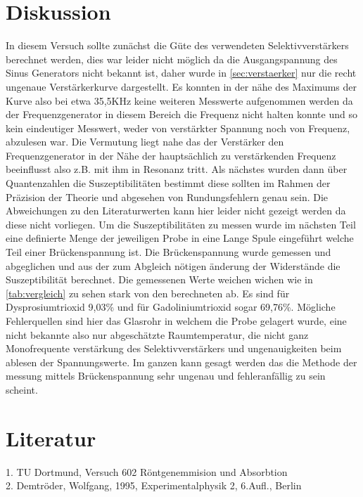 \section{Diskussion} %
\label{sec:Diskussion}
In diesem Versuch sollte zunächst die Güte des verwendeten Selektivverstärkers berechnet werden,
dies war leider nicht möglich da die Ausgangspannung des Sinus Generators nicht bekannt ist, daher
wurde in \autoref{sec:verstaerker} nur die recht ungenaue Verstärkerkurve dargestellt. Es konnten
in der nähe des Maximums der Kurve also bei etwa 35,5KHz keine weiteren Messwerte aufgenommen werden
da der Frequenzgenerator in diesem Bereich die Frequenz nicht halten konnte und so kein eindeutiger 
Messwert, weder von verstärkter Spannung noch von Frequenz, abzulesen war. Die Vermutung liegt nahe das
der Verstärker den Frequenzgenerator in der Nähe der hauptsächlich zu verstärkenden Frequenz beeinflusst
also z.B. mit ihm in Resonanz tritt. Als nächstes wurden dann über Quantenzahlen die Suszeptibilitäten 
bestimmt diese sollten im Rahmen der Präzision der Theorie und abgesehen von Rundungsfehlern genau sein. Die
Abweichungen zu den Literaturwerten kann hier leider nicht gezeigt werden da diese nicht vorliegen.
Um die Suszeptibilitäten zu messen wurde im nächsten Teil eine definierte Menge 
der jeweiligen Probe in eine Lange Spule eingeführt welche Teil einer Brückenspannung
ist. Die Brückenspannung wurde gemessen und abgeglichen und aus der zum Abgleich nötigen änderung der Widerstände
die Suszeptibilität berechnet. Die gemessenen Werte weichen wichen wie in \autoref{tab:vergleich} zu sehen stark von den berechneten ab.
Es sind für Dysprosiumtrioxid 9,03\% und für Gadoliniumtrioxid sogar 69,76\%. 
Mögliche Fehlerquellen sind hier das Glasrohr in welchem die Probe gelagert wurde,
eine nicht bekannte also nur abgeschätzte Raumtemperatur, die nicht ganz Monofrequente verstärkung des Selektivverstärkers
und ungenauigkeiten beim ablesen der Spannungswerte.
Im ganzen kann gesagt werden das die Methode der messung mittels Brückenspannung sehr ungenau und fehleranfällig zu sein scheint.
\section{Literatur}
\label{Literatur}
1. TU Dortmund, Versuch 602 Röntgenemmision und Absorbtion\\
2. Demtröder, Wolfgang, 1995, Experimentalphysik 2, 6.Aufl., Berlin\\
